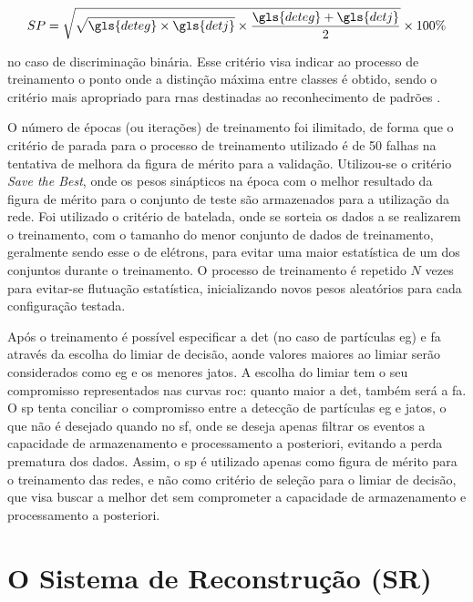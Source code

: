 \begin{equation} \label{eq:produto_sp}
SP = \sqrt{ \sqrt{\gls{deteg}\times \gls{detj}}\times\frac{\gls{deteg}+\gls{detj}}{2}}\times100\%
\end{equation}

\noindent no caso de discriminação binária. Esse critério visa indicar ao
processo de treinamento o ponto onde a distinção máxima entre classes é obtido,
sendo o critério mais apropriado para \glspl{rna} destinadas ao reconhecimento de
padrões \cite{tese_torres}.

O número de épocas (ou iterações) de treinamento foi ilimitado, de forma que o
critério de parada para o processo de treinamento utilizado é de 50 falhas na tentativa
de melhora da figura de mérito para a validação. 
Utilizou-se o critério \emph{Save the Best}, onde os pesos sinápticos na época com 
o melhor resultado da figura de mérito para o conjunto de teste são armazenados 
para a utilização da rede. Foi utilizado o critério de batelada, onde se sorteia os
dados a se realizarem o treinamento, com o tamanho do menor 
conjunto de dados de treinamento, geralmente sendo esse o de elétrons, para
evitar uma maior estatística de um dos conjuntos durante o treinamento. O
processo de treinamento é repetido $N$ vezes para evitar-se flutuação
estatística, inicializando novos pesos aleatórios para cada configuração 
testada.


Após o treinamento é possível especificar a \gls{det} (no caso de partículas \gls{eg}) 
e \gls{fa} através da escolha do limiar de decisão, aonde valores maiores ao limiar serão considerados
como \gls{eg} e os menores jatos. A escolha do limiar tem o seu compromisso
representados nas curvas \gls{roc}: quanto maior a \gls{det}, também será a
\gls{fa}. O \gls{sp} tenta conciliar o compromisso entre a detecção de
partículas \gls{eg} e jatos, o que não é desejado quando no \gls{sf}, onde se
deseja apenas filtrar os eventos a capacidade de armazenamento e processamento a
posteriori, evitando a perda prematura dos dados. Assim, o \gls{sp} é utilizado
apenas como figura de mérito para o treinamento das redes, e não como critério
de seleção para o limiar de decisão, que visa buscar a melhor \gls{det} sem
comprometer a capacidade de armazenamento e processamento a posteriori.

\section{O Sistema de Reconstrução (SR)}
\label{sec:sr}

